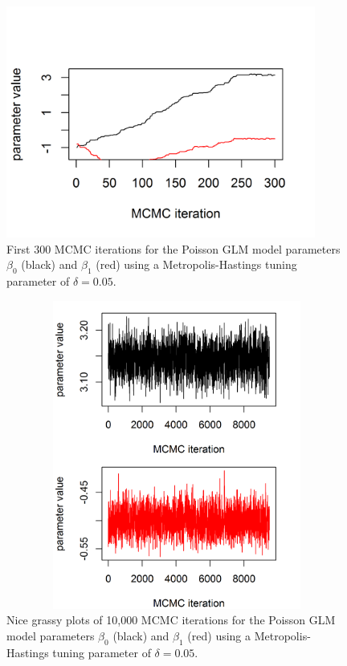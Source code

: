 \begin{figure}
\begin{center}
\includegraphics[height=3in,width=4in]{Ch2-Bayes/figs/poissonmcmc2}
\end{center}
\caption{First 300 MCMC iterations for the Poisson GLM model parameters $\beta_0$ (black) and $\beta_1$ (red) using
a Metropolis-Hastings tuning parameter of
 $\delta = 0.05$.}
\label{glms.fig.poissonmcmc2}
\end{figure}

\begin{figure}
\begin{center}
\includegraphics[height=4in,width=5in]{Ch2-Bayes/figs/poissonmcmc3}
\end{center}
\caption{Nice grassy plots of 10,000 MCMC iterations for the Poisson
  GLM model parameters $\beta_0$ (black) and $\beta_1$ (red) using a
  Metropolis-Hastings tuning parameter of $\delta = 0.05$.}
\label{glms.fig.grassy}
\end{figure}

